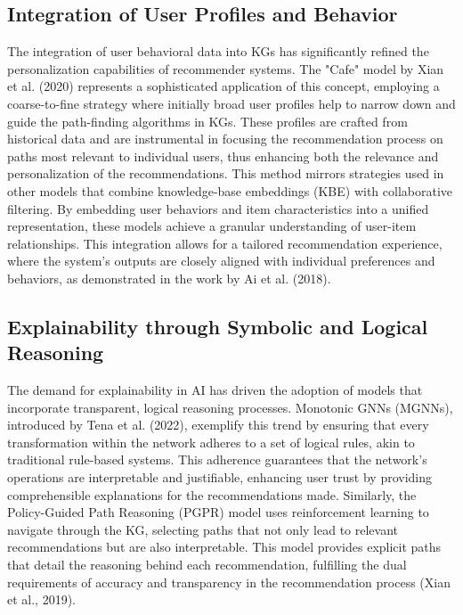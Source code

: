 \subsection{Integration of User Profiles and Behavior}

The integration of user behavioral data into KGs has significantly refined the personalization capabilities of recommender systems. The "Cafe" model by Xian et al. (2020) represents a sophisticated application of this concept, employing a coarse-to-fine strategy where initially broad user profiles help to narrow down and guide the path-finding algorithms in KGs. These profiles are crafted from historical data and are instrumental in focusing the recommendation process on paths most relevant to individual users, thus enhancing both the relevance and personalization of the recommendations.
This method mirrors strategies used in other models that combine knowledge-base embeddings (KBE) with collaborative filtering. By embedding user behaviors and item characteristics into a unified representation, these models achieve a granular understanding of user-item relationships. This integration allows for a tailored recommendation experience, where the system's outputs are closely aligned with individual preferences and behaviors, as demonstrated in the work by Ai et al. (2018).

\subsection{Explainability through Symbolic and Logical Reasoning}

The demand for explainability in AI has driven the adoption of models that incorporate transparent, logical reasoning processes. Monotonic GNNs (MGNNs), introduced by Tena et al. (2022), exemplify this trend by ensuring that every transformation within the network adheres to a set of logical rules, akin to traditional rule-based systems. This adherence guarantees that the network's operations are interpretable and justifiable, enhancing user trust by providing comprehensible explanations for the recommendations made.
Similarly, the Policy-Guided Path Reasoning (PGPR) model uses reinforcement learning to navigate through the KG, selecting paths that not only lead to relevant recommendations but are also interpretable. This model provides explicit paths that detail the reasoning behind each recommendation, fulfilling the dual requirements of accuracy and transparency in the recommendation process (Xian et al., 2019).

